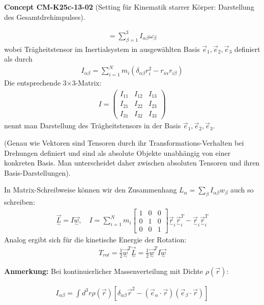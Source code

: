 \documentclass[10pt, letterpaper]{article}
\newcommand{\CustomHeading}[3]{%
  \par\medskip\noindent%
  \textbf{#1 #2} \textnormal{(#3)}.\enskip%
}
\newenvironment{CONC}[2]{\CustomHeading{Concept}{#1}{#2}}{}
\begin{document}
\begin{CONC}{CM-K25c-13-02}{Setting für Kinematik starrer Körper: Darstellung des Gesamtdrehimpulses}
\[\begin{aligned}
= \sum_{\beta=1}^3 I_{\alpha\beta} \omega_\beta
\end{aligned}
\]
wobei Trägheitstensor im Inertialsystem in ausgewählten Basis $\vec{e}_1, \vec{e}_2, \vec{e}_3$ definiert als durch
$$
\begin{aligned}
I_{\alpha\beta} = \sum_{i=1}^N m_i \left(\delta_{\alpha\beta} r_i^2 - r_{i\alpha} r_{i\beta}\right)
\end{aligned}
$$
Die entsprechende 3$\times$3-Matrix:
$$
\begin{aligned}
I = \begin{pmatrix}
I_{11} & I_{12} & I_{13} \\
I_{21} & I_{22} & I_{23} \\
I_{31} & I_{32} & I_{33}
\end{pmatrix}
\end{aligned}
$$
nennt man Darstellung des Trägheitstensors in der Basis $\vec{e}_1,\vec{e}_2,\vec{e}_3$.

(Genau wie Vektoren sind Tensoren durch ihr Transformations-Verhalten bei Drehungen definiert und sind als absolute Objekte unabhängig von einer konkreten Basis. Man unterscheidet daher zwischen absoluten Tensoren und ihren Basis-Darstellungen).

In Matrix-Schreibweise können wir den Zusammenhang $L_\alpha = \sum_\beta I_{\alpha\beta}w_\beta$ auch so schreiben:
$$
\begin{aligned}
\vec{\underset{\sim}{L}} = I \vec{\underset{\sim}{w}}, \quad I = \sum_{i=1}^N m_i \begin{bmatrix}
1 & 0 & 0 \\
0 & 1 & 0 \\
0 & 0 & 1
\end{bmatrix} \vec{\underset{\sim}{r}}_i \vec{\underset{\sim}{r}}_i^T - \vec{\underset{\sim}{r}}_i \vec{\underset{\sim}{r}}_i^T
\end{aligned}
$$
Analog ergibt sich für die kinetische Energie der Rotation:
$$
\begin{aligned}
T_{rot} = \frac{1}{2} \vec{\underset{\sim}{w}}^T \vec{\underset{\sim}{L}} = \frac{1}{2} \vec{\underset{\sim}{w}}^T I \vec{\underset{\sim}{w}}
\end{aligned}
$$



\textbf{Anmerkung:} Bei kontinuierlicher Massenverteilung mit Dichte $\rho(\vec{r})$:

$$
\begin{aligned}
I_{\alpha\beta} = \int d^3r \rho(\vec{r}) \left[\delta_{\alpha\beta} \vec{r}^2 - (\vec{e}_\alpha \cdot \vec{r})(\vec{e}_\beta \cdot \vec{r})\right]
\end{aligned}
$$
\end{CONC}
\end{document}
